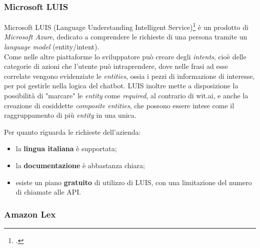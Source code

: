 \subsubsection{Microsoft LUIS}
Microsoft LUIS (Language Understanding Intelligent Service)\footcite{luis} è un prodotto di \emph{Microsoft Azure}, dedicato a comprendere le richieste di una persona tramite un \emph{language model} (entity/intent). \\
Come nelle altre piattaforme lo sviluppatore può creare degli \emph{intents}, cioè delle categorie di azioni che l'utente può intraprendere, dove nelle frasi ad esse correlate vengono evidenziate le \emph{entities}, ossia i pezzi di informazione di interesse, per poi gestirle nella logica del \gls{chatbot}. LUIS inoltre mette a disposizione la possibilità di "marcare" le \emph{entity} come \emph{required}, al contrario di wit.ai, e anche la creazione di cosiddette \emph{composite entities}, che possono essere intese come il raggruppamento di più \emph{entity} in una unica.

Per quanto riguarda le richieste dell'azienda:
\begin{itemize}
	\item la \textbf{lingua italiana} è supportata;
	\item la \textbf{documentazione} è abbastanza chiara;
	\item esiste un piano \textbf{gratuito} di utilizzo di LUIS, con una limitazione del numero di chiamate alle API.
\end{itemize}

\subsubsection{Amazon Lex}
